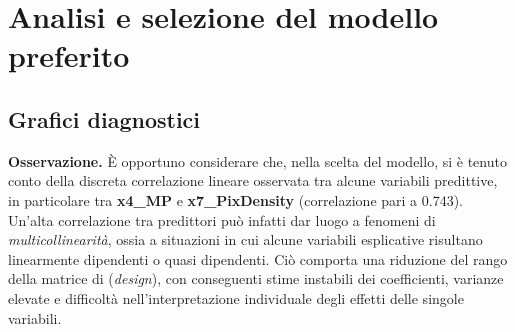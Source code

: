 \section{Analisi e selezione del modello preferito}
\subsection{Grafici diagnostici}
\textbf{Osservazione.} È opportuno considerare che, nella scelta del modello, si è tenuto conto della discreta correlazione lineare osservata tra alcune variabili predittive, in particolare tra \textbf{x4\_MP} e \textbf{x7\_PixDensity} (correlazione pari a 0.743). \\ 
   Un’alta correlazione tra predittori può infatti dar luogo a fenomeni di \emph{multicollinearità}, ossia a situazioni in cui alcune variabili esplicative risultano linearmente dipendenti o quasi dipendenti. Ciò comporta una riduzione del rango della matrice di (\emph{design}), con conseguenti stime instabili dei coefficienti, varianze elevate e difficoltà nell’interpretazione individuale degli effetti delle singole variabili.
   
